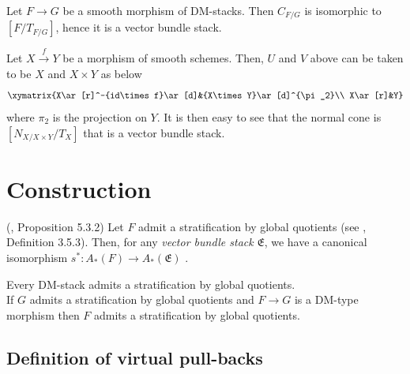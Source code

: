 \begin{example}\label{manolacheVirtualPullbacks2012-ex-2.38}
 \label{manolacheVirtualPullbacks2012-flat} Let $F\to G$ be a smooth morphism of DM-stacks. Then $C_{F/G}$ is isomorphic to $[F/T_{F/G}]$, hence it is a vector bundle stack.
\end{example}

\begin{example}\label{manolacheVirtualPullbacks2012-ex-2.39}
Let $X\stackrel{f}\rightarrow Y$ be a morphism of smooth schemes. Then, $U$ and $V$ above can be taken to be $X$ and $X\times Y$ as below
\begin{equation*}
\xymatrix{X\ar[r]^-{id\times f}\ar[d]&{X\times Y}\ar[d]^{\pi_2}\\
X\ar[r]&Y}
\end{equation*}
where $\pi_2$ is the projection on $Y$. It is then easy to see that the normal cone is $[N_{X/X\times Y}/T_{X}]$ that is a vector bundle stack.
\end{example}

\section{Construction}\label{manolacheVirtualPullbacks2012-sec-3}

\begin{proposition}\label{manolacheVirtualPullbacks2012-prop-3.1}
(\cite{K:03}, Proposition 5.3.2)\label{manolacheVirtualPullbacks2012-stratif}
Let $F$ admit a stratification by global quotients  (see \cite{K:03}, Definition 3.5.3). Then, for any \emph{vector bundle stack} $\mathfrak{E}$, we have a canonical isomorphism $s^*:A_*(F)\to A_*(\mathfrak{E})$ .
\end{proposition}

\begin{remark}\label{manolacheVirtualPullbacks2012-rem-3.2}
Every DM-stack admits a stratification by global quotients.
\\If $G$ admits a stratification by global quotients and $F\to G$ is a DM-type morphism then $F$ admits a stratification by global quotients.
\end{remark}

\subsection{Definition of virtual pull-backs}\label{manolacheVirtualPullbacks2012-sec-3.1}

